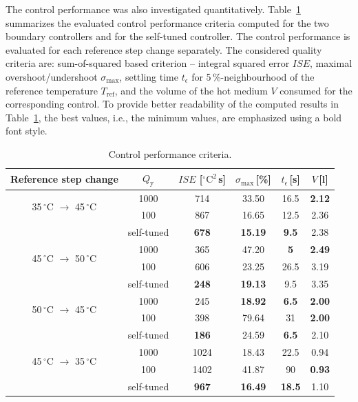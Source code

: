 \documentclass[preprint,12pt]{elsarticle}
\begin{document}
	The control performance was also investigated quantitatively. Table~\ref{tab:control_performance} summarizes the evaluated control performance criteria computed for the two boundary controllers and for the self-tuned controller. The control performance is evaluated for each reference step change separately. The considered quality criteria are: sum-of-squared based criterion -- integral squared error $ISE$, maximal overshoot/undershoot $\sigma_{\mathrm{max}}$, settling time $t_{\epsilon}$ for 5\,\%-neighbourhood of the reference temperature $T_{\mathrm{ref}}$, and the volume of the hot medium $V$ consumed for the corresponding control. To provide better readability of the computed results in Table~\ref{tab:control_performance}, the best values, i.e., the minimum values, are emphasized using a bold font style. 
	
	\begin{table}[h!]
		\begin{center}
			\caption{Control performance criteria.}
			\label{tab:control_performance}
			\begin{tabular}{c|c|c|c|c|c} 
				Reference step change & $Q_\mathrm{y}$ & $ISE$ [$^{\circ}\mathrm{C}^2$\,s] & $\sigma_{\mathrm{max}}$\,[\%] & $t_{\epsilon}$\,[s] & $V$\,[l] \\
				\hline
				\multirow{2}{*}{ 35\,$^{\circ}$C $\rightarrow$ 45\,$^{\circ}$C } & 1000 & 714 & 33.50 & 16.5 & \textbf{2.12} \\
				& 100 & 867 & 16.65 & 12.5 & 2.36 \\ 
				& self-tuned & \textbf{678} & \textbf{15.19} & \textbf{9.5} & 2.38 \\ 
				\hline
				\multirow{2}{*}{ 45\,$^{\circ}$C $\rightarrow$ 50\,$^{\circ}$C } & 1000 & 365 & 47.20 & \textbf{5} & \textbf{2.49} \\
				& 100 & 606 & 23.25 & 26.5 & 3.19 \\ 
				& self-tuned & \textbf{248} & \textbf{19.13} & 9.5 & 3.35 \\ 
				\hline
				\multirow{2}{*}{ 50\,$^{\circ}$C $\rightarrow$ 45\,$^{\circ}$C } & 1000 & 245 & \textbf{18.92} & \textbf{6.5} & \textbf{2.00} \\
				& 100 & 398 & 79.64 & 31 & \textbf{2.00} \\ 
				& self-tuned & \textbf{186} & 24.59 & \textbf{6.5} & 2.10 \\ 
				\hline
				\multirow{2}{*}{ 45\,$^{\circ}$C $\rightarrow$ 35\,$^{\circ}$C } & 1000 & 1024 & 18.43 & 22.5 & 0.94 \\
				& 100 & 1402 & 41.87 & 90 & \textbf{0.93} \\ 
				& self-tuned & \textbf{967} & \textbf{16.49} & \textbf{18.5} & 1.10  
			\end{tabular}
		\end{center}
	\end{table}
	
\end{document}
